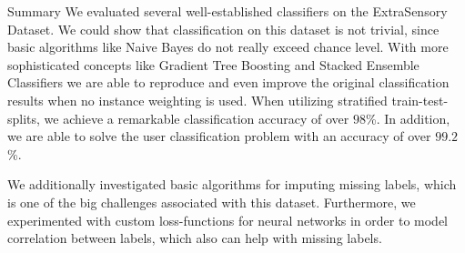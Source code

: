 \begin{section}{Summary}
	We evaluated several well-established classifiers on the ExtraSensory Dataset. We could show that classification on this dataset is not trivial, since basic algorithms like Naive Bayes do not really exceed chance level. With more sophisticated concepts like Gradient Tree Boosting and Stacked Ensemble Classifiers we are able to reproduce and even improve the original classification results when no instance weighting is used. When utilizing stratified train-test-splits, we achieve a remarkable classification accuracy of over $98$\%. In addition, we are able to solve the user classification problem with an accuracy of over $99.2$\%. \par
	We additionally investigated basic algorithms for imputing missing labels, which is one of the big challenges associated with this dataset. Furthermore, we experimented with custom loss-functions for neural networks in order to model correlation between labels, which also can help with missing labels.
\end{section}